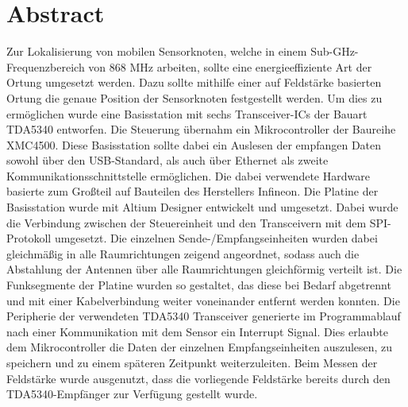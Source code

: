 \newpage
\chapter*{Abstract}
\label{sec:abstract}
\pagestyle{scrheadings}

Zur Lokalisierung von mobilen Sensorknoten, welche in einem Sub-GHz-Frequenzbereich von 868 MHz arbeiten, sollte eine energieeffiziente Art der Ortung umgesetzt werden. Dazu sollte mithilfe einer auf Feldstärke basierten Ortung die genaue Position der Sensorknoten festgestellt werden. Um dies zu ermöglichen wurde eine Basisstation mit sechs Transceiver-ICs der Bauart TDA5340 entworfen. Die Steuerung übernahm ein Mikrocontroller der Baureihe XMC4500. Diese Basisstation sollte dabei ein Auslesen der empfangen Daten  sowohl über den USB-Standard, als auch über Ethernet als zweite Kommunikationsschnittstelle ermöglichen. Die dabei verwendete Hardware basierte zum Großteil auf Bauteilen des Herstellers Infineon. 
Die Platine der Basisstation wurde mit Altium Designer entwickelt und umgesetzt. Dabei wurde die  Verbindung zwischen der Steuereinheit und den Transceivern mit dem SPI-Protokoll umgesetzt. Die einzelnen Sende-/Empfangseinheiten wurden dabei gleichmäßig in alle Raumrichtungen zeigend angeordnet, sodass auch die Abstahlung der Antennen über alle Raumrichtungen gleichförmig verteilt ist. Die Funksegmente der Platine wurden so gestaltet, das diese bei Bedarf abgetrennt und mit einer Kabelverbindung weiter voneinander entfernt werden konnten.
Die Peripherie der verwendeten TDA5340 Transceiver generierte im Programmablauf nach einer Kommunikation mit dem Sensor ein Interrupt Signal. Dies erlaubte dem Mikrocontroller die Daten der einzelnen Empfangseinheiten auszulesen, zu speichern und zu einem späteren Zeitpunkt weiterzuleiten. Beim Messen der Feldstärke wurde ausgenutzt, dass die vorliegende Feldstärke bereits durch den TDA5340-Empfänger zur Verfügung gestellt wurde.


